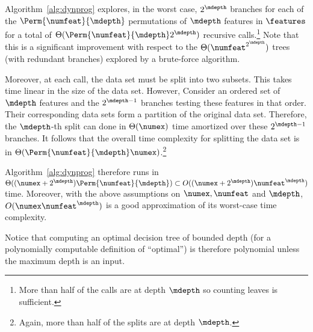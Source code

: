 \documentclass{article}
\begin{document}
	 
	 Algorithm~\ref{alg:dynprog} explores, in the worst case, $2^{\mdepth}$ branches for each of the $\Perm{\numfeat}{\mdepth}$ permutations of $\mdepth$ features in $\features$ for a total of $\Theta(\Perm{\numfeat}{\mdepth}2^{\mdepth})$ recursive calls.\footnote{More than half of the calls are at depth $\mdepth$ so counting leaves is sufficient.} 
	 Note that this is a significant improvement with respect to the $\Theta(\numfeat^{2^{\mdepth}})$ trees (with redundant branches) explored by a brute-force algorithm.
	 
	 Moreover, at each call, the data set must be split into two subsets. This takes time linear in the size of the data set. However,  %
	 Consider
	 an ordered set of $\mdepth$ features and the $2^{\mdepth-1}$ branches testing these features in that order. Their corresponding data sets form a partition of the original data set. Therefore, the $\mdepth$-th split can done in $\Theta(\numex)$ time amortized over these $2^{\mdepth-1}$ branches.
	 It follows that the overall time complexity for splitting the data set is in $\Theta(\Perm{\numfeat}{\mdepth}\numex)$.\footnote{Again, more than half of the splits are at depth $\mdepth$.}
	 
	 
	 
	 Algorithm~\ref{alg:dynprog} therefore runs in $\Theta((\numex+2^\mdepth){\Perm{\numfeat}{\mdepth}}) \subset O((\numex + 2^{\mdepth})\numfeat^\mdepth)$ time. Moreover, with the above assumptions on $\numex,\numfeat$ and $\mdepth$, $O(\numex\numfeat^\mdepth)$ is a good approximation of its worst-case time complexity.
	 
	 
	 
	 Notice that computing an optimal decision tree of bounded depth (for a polynomially computable definition of ``optimal'') is therefore polynomial unless the maximum depth is an input.
	 
	 
	 
\end{document}
